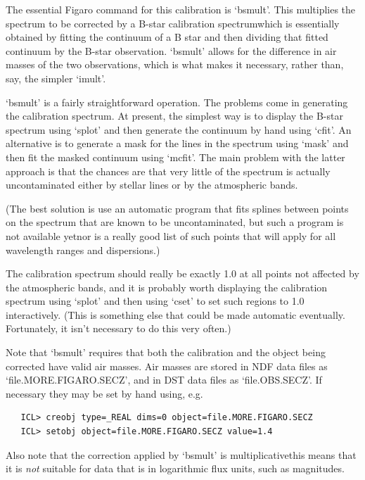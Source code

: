   The essential Figaro command for this calibration is `bsmult'.  This
   multiplies the spectrum to be corrected by a B-star calibration
   spectrum\latorhtm{---}{-}which is essentially obtained by fitting the
   continuum of
   a B star and then dividing that fitted continuum by the B-star
   observation.  `bsmult' allows for the difference in air masses of the
   two observations, which is what makes it necessary, rather than, say,
   the simpler `imult'.

   `bsmult' is a fairly straightforward operation.  The problems come in
   generating the calibration spectrum.  At present, the simplest way is
   to display the B-star spectrum using `splot' and then generate the
   continuum by hand using `cfit'.  An alternative is to generate a mask
   for the lines in the spectrum using `mask' and then fit the masked
   continuum using `mcfit'.  The main problem with the latter approach
   is that the chances are that very little of the spectrum is actually
   uncontaminated either by stellar lines or by the atmospheric bands.

   (The best solution is use an automatic program that fits splines
   between points on the spectrum that are known to be uncontaminated,
   but such a program is not available yet\latorhtm{---}{-}nor is a really
   good list of such points that will apply for all wavelength ranges and
   dispersions.)

   The calibration spectrum should really be exactly 1.0 at all points
   not affected by the atmospheric bands, and it is probably worth
   displaying the calibration spectrum using `splot' and then using
   `cset' to set such regions to 1.0 interactively.  (This is something
   else that could be made automatic eventually.  Fortunately, it isn't
   necessary to do this very often.)

   Note that `bsmult' requires that both the calibration and the object
   being corrected have valid air masses.  Air masses are stored in NDF
   data files as `file.MORE.FIGARO.SECZ', and in DST data files as
   `file.OBS.SECZ'. If necessary they may be set by hand using, e.g.

\begin{verbatim}
   ICL> creobj type=_REAL dims=0 object=file.MORE.FIGARO.SECZ
   ICL> setobj object=file.MORE.FIGARO.SECZ value=1.4
\end{verbatim}

   Also note that the correction applied by `bsmult' is
   multiplicative\latorhtm{---}{-}this means that it is {\em not\/}
   suitable for data that is in logarithmic flux units, such as
   magnitudes.

